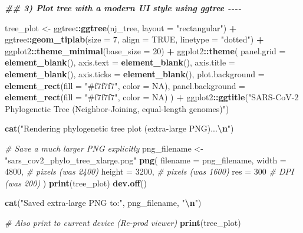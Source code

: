\documentclass[
  11pt,
]{article}
\newenvironment{Shaded}{\begin{snugshade}}{\end{snugshade}}
\newcommand{\AttributeTok}[1]{\textcolor[rgb]{0.13,0.29,0.53}{#1}}
\newcommand{\CommentTok}[1]{\textcolor[rgb]{0.56,0.35,0.01}{\textit{#1}}}
\newcommand{\ConstantTok}[1]{\textcolor[rgb]{0.56,0.35,0.01}{#1}}
\newcommand{\DecValTok}[1]{\textcolor[rgb]{0.00,0.00,0.81}{#1}}
\newcommand{\DocumentationTok}[1]{\textcolor[rgb]{0.56,0.35,0.01}{\textbf{\textit{#1}}}}
\newcommand{\FunctionTok}[1]{\textcolor[rgb]{0.13,0.29,0.53}{\textbf{#1}}}
\newcommand{\NormalTok}[1]{#1}
\newcommand{\OtherTok}[1]{\textcolor[rgb]{0.56,0.35,0.01}{#1}}
\newcommand{\SpecialCharTok}[1]{\textcolor[rgb]{0.81,0.36,0.00}{\textbf{#1}}}
\newcommand{\StringTok}[1]{\textcolor[rgb]{0.31,0.60,0.02}{#1}}
\begin{document}
\begin{Shaded}
\begin{Highlighting}[]
\DocumentationTok{\#\# 3) Plot tree with a modern UI style using ggtree {-}{-}{-}{-}}

\NormalTok{tree\_plot }\OtherTok{\textless{}{-}}\NormalTok{ ggtree}\SpecialCharTok{::}\FunctionTok{ggtree}\NormalTok{(nj\_tree, }\AttributeTok{layout =} \StringTok{"rectangular"}\NormalTok{) }\SpecialCharTok{+}
\NormalTok{  ggtree}\SpecialCharTok{::}\FunctionTok{geom\_tiplab}\NormalTok{(}\AttributeTok{size =} \DecValTok{7}\NormalTok{, }\AttributeTok{align =} \ConstantTok{TRUE}\NormalTok{, }\AttributeTok{linetype =} \StringTok{"dotted"}\NormalTok{) }\SpecialCharTok{+}
\NormalTok{  ggplot2}\SpecialCharTok{::}\FunctionTok{theme\_minimal}\NormalTok{(}\AttributeTok{base\_size =} \DecValTok{20}\NormalTok{) }\SpecialCharTok{+}
\NormalTok{  ggplot2}\SpecialCharTok{::}\FunctionTok{theme}\NormalTok{(}
    \AttributeTok{panel.grid =} \FunctionTok{element\_blank}\NormalTok{(),}
    \AttributeTok{axis.text =} \FunctionTok{element\_blank}\NormalTok{(),}
    \AttributeTok{axis.title =} \FunctionTok{element\_blank}\NormalTok{(),}
    \AttributeTok{axis.ticks =} \FunctionTok{element\_blank}\NormalTok{(),}
    \AttributeTok{plot.background =} \FunctionTok{element\_rect}\NormalTok{(}\AttributeTok{fill =} \StringTok{"\#f7f7f7"}\NormalTok{, }\AttributeTok{color =} \ConstantTok{NA}\NormalTok{),}
    \AttributeTok{panel.background =} \FunctionTok{element\_rect}\NormalTok{(}\AttributeTok{fill =} \StringTok{"\#f7f7f7"}\NormalTok{, }\AttributeTok{color =} \ConstantTok{NA}\NormalTok{)}
\NormalTok{  ) }\SpecialCharTok{+}
\NormalTok{  ggplot2}\SpecialCharTok{::}\FunctionTok{ggtitle}\NormalTok{(}\StringTok{"SARS{-}CoV{-}2 Phylogenetic Tree (Neighbor{-}Joining, equal{-}length genomes)"}\NormalTok{)}

\FunctionTok{cat}\NormalTok{(}\StringTok{"Rendering phylogenetic tree plot (extra{-}large PNG)...}\SpecialCharTok{\textbackslash{}n}\StringTok{"}\NormalTok{)}

\CommentTok{\# Save a much larger PNG explicitly}
\NormalTok{png\_filename }\OtherTok{\textless{}{-}} \StringTok{"sars\_cov2\_phylo\_tree\_xlarge.png"}
\FunctionTok{png}\NormalTok{(}
  \AttributeTok{filename =}\NormalTok{ png\_filename,}
  \AttributeTok{width =} \DecValTok{4800}\NormalTok{,   }\CommentTok{\# pixels (was 2400)}
  \AttributeTok{height =} \DecValTok{3200}\NormalTok{,  }\CommentTok{\# pixels (was 1600)}
  \AttributeTok{res =} \DecValTok{300}       \CommentTok{\# DPI (was 200)}
\NormalTok{)}
\FunctionTok{print}\NormalTok{(tree\_plot)}
\FunctionTok{dev.off}\NormalTok{()}

\FunctionTok{cat}\NormalTok{(}\StringTok{"Saved extra{-}large PNG to:"}\NormalTok{, png\_filename, }\StringTok{"}\SpecialCharTok{\textbackslash{}n}\StringTok{"}\NormalTok{)}

\CommentTok{\# Also print to current device (Re{-}prod viewer)}
\FunctionTok{print}\NormalTok{(tree\_plot)}
\end{Highlighting}
\end{Shaded}
\end{document}
